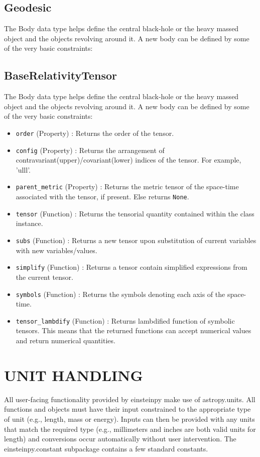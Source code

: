 \documentclass{aastex63}
\begin{document}
\subsection{Geodesic} \label{subsec:Geodesic}
The Body data type helps define the central black-hole or the heavy massed object and the objects revolving around it. A new body can be defined by some of the very basic constraints:

\subsection{BaseRelativityTensor} \label{subsec:BaseRelativityTensor}
The Body data type helps define the central black-hole or the heavy massed object and the objects revolving around it. A new body can be defined by some of the very basic constraints:
\begin{itemize}
\item \texttt{order} (Property) : Returns the order of the tensor. 
\item \texttt{config} (Property) : Returns the arrangement of contravariant(upper)/covariant(lower) indices of the tensor. For example, 'ulll'.
\item \texttt{parent\_metric} (Property) : Returns the metric tensor of the space-time associated with the tensor, if present. Else returns \texttt{None}.
\item \texttt{tensor} (Function) : Returns the tensorial quantity contained within the class instance.
\item \texttt{subs} (Function) : Returns a new tensor upon substitution of current variables with new variables/values.
\item \texttt{simplify} (Function) : Returns a tensor contain simplified expressions from the current tensor.
\item \texttt{symbols} (Function) : Returns the symbols denoting each axis of the space-time.
\item \texttt{tensor\_lambdify} (Function) : Returns lambdified function of symbolic tensors. This means that the returned functions can accept numerical values and return numerical quantities.
\end{itemize}


\section{UNIT HANDLING} \label{sec:unithandle}
All user-facing functionality provided by einsteinpy make use of astropy.units. 
All functions and objects must have their input constrained to the appropriate type of unit (e.g., length, mass or energy). Inputs can then be provided with any units that match the required type (e.g., millimeters and inches are both valid units for length) and conversions occur automatically without user intervention. The einsteinpy.constant subpackage contains a few standard constants.
\end{document}
